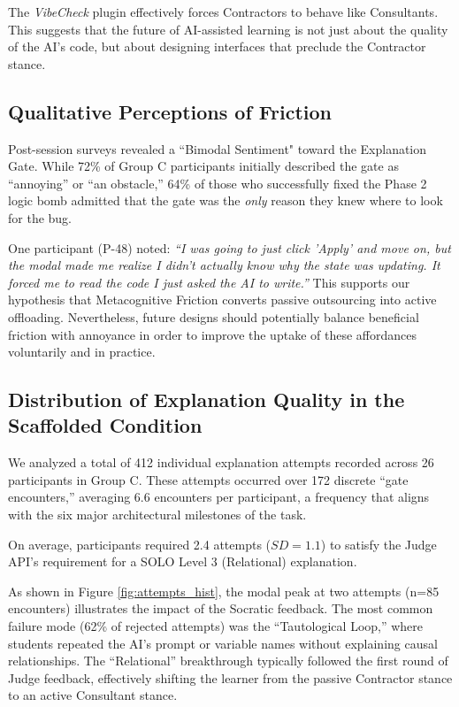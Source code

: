 \documentclass[sigconf]{acmart}
\begin{document}
The \textit{VibeCheck} plugin effectively forces Contractors to behave like Consultants. This suggests that the future of AI-assisted learning is not just about the quality of the AI's code, but about designing interfaces that preclude the Contractor stance.

\subsection{Qualitative Perceptions of Friction}
Post-session surveys revealed a ``Bimodal Sentiment" toward the Explanation Gate. While 72\% of Group C participants initially described the gate as ``annoying'' or ``an obstacle,'' 64\% of those who successfully fixed the Phase 2 logic bomb admitted that the gate was the \textit{only} reason they knew where to look for the bug. 

One participant (P-48) noted: \textit{``I was going to just click 'Apply' and move on, but the modal made me realize I didn't actually know why the state was updating. It forced me to read the code I just asked the AI to write.''} This supports our hypothesis that Metacognitive Friction converts passive outsourcing into active offloading. Nevertheless, future designs should potentially balance beneficial friction with annoyance in order to improve the uptake of these affordances voluntarily and in practice.

\subsection{Distribution of Explanation Quality in the Scaffolded Condition}
We analyzed a total of 412 individual explanation attempts recorded across 26 participants in Group C. These attempts occurred over 172 discrete ``gate encounters,'' averaging 6.6 encounters per participant, a frequency that aligns with the six major architectural milestones of the task. 

On average, participants required 2.4 attempts ($SD=1.1$) to satisfy the Judge API's requirement for a SOLO Level 3 (Relational) explanation. 

As shown in Figure \ref{fig:attempts_hist}, the modal peak at two attempts (n=85 encounters) illustrates the impact of the Socratic feedback. The most common failure mode (62\% of rejected attempts) was the ``Tautological Loop,'' where students repeated the AI's prompt or variable names without explaining causal relationships. The ``Relational'' breakthrough typically followed the first round of Judge feedback, effectively shifting the learner from the passive Contractor stance to an active Consultant stance.
\end{document}
